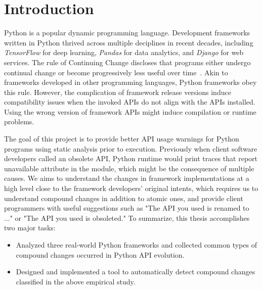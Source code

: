 \chapter{Introduction}
\label{chap:introduction}

Python is a popular dynamic programming language. Development frameworks written in Python thrived across multiple deciplines in recent decades, including \textit{TensorFlow} for deep learning, \textit{Pandas} for data analytics, and \textit{Django} for web services. The rule of Continuing Change discloses that programs either undergo continual change or become progressively less useful over time~\cite{evo-laws}. Akin to frameworks developed in other programming languages, Python frameworks obey this rule. However, the complication of framework release versions induce compatibility issues when the invoked APIs do not align with the APIs installed. Using the wrong version of framework APIs might induce compilation or runtime problems.

The goal of this project is to provide better API usage warnings for Python programs using static analysis prior to execution. Previously when client software developers called an obsolete API, Python runtime would print traces that report unavailable attribute in the module, which might be the consequence of multiple causes. We aims to understand the changes in framework implementations at a high level close to the framework developers' original intents, which requires us to understand compound changes in addition to atomic ones, and provide client programmers with useful suggestions such as "The API you used is renamed to ..." or "The API you used is obsoleted."
To summarize, this thesis accomplishes two major tasks:

\begin{itemize}
  \item Analyzed three real-world Python frameworks and collected common types of compound changes occurred in Python API evolution.
  \item Designed and implemented a tool to automatically detect compound changes classified in the above empirical study.
\end{itemize}
